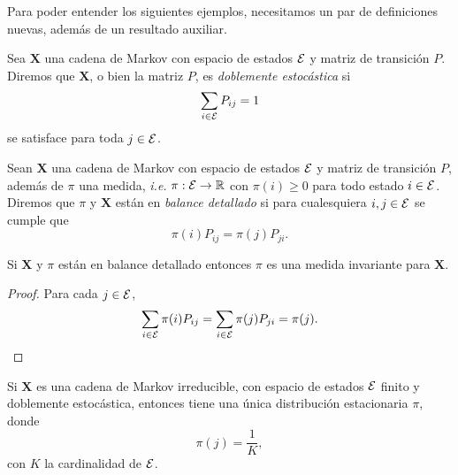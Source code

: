 Para poder entender los siguientes ejemplos, necesitamos un par de definiciones nuevas, además de un resultado auxiliar.

\begin{definition}
    Sea $\bm X$ una cadena de Markov con espacio de estados $\mathcal{E}$ y matriz de transición $P$. Diremos que $\bm X$, o bien la matriz $P$, es \emph{doblemente estocástica} si 
    \[
        \sum_{i \in \mathcal{E}} P_{ij} = 1    
    \]
    se satisface para toda $j \in \mathcal{E}$.
\end{definition}

\begin{definition}
    Sean $\bm X$ una cadena de Markov con espacio de estados $\mathcal{E}$ y matriz de transición $P$, además de $\pi$ una medida, \emph{i.e.} $\pi: \mathcal{E} \to \mathbb{R}$ con $\pi(i) \geq 0$ para todo estado $i \in \mathcal{E}$. Diremos que $\pi$ y $\bm X$ están en \emph{balance detallado} si para cualesquiera $i, j \in \mathcal{E}$ se cumple que 
    \[
        \pi(i) P_{ij} = \pi(j) P_{ji}.    
    \]
\end{definition}

\begin{proposition}
    Si $\bm X$ y $\pi$ están en balance detallado entonces $\pi$ es una medida invariante para $\bm X$.
\end{proposition}

\begin{proof}
    Para cada $j \in \mathcal{E}$,
    \[
        \sum_{i \in \mathcal{E}} \pi(i) P_{ij} = \sum_{i \in \mathcal{E}} \pi(j) P_{ji} = \pi(j). \qedhere
    \]
\end{proof}

\begin{example}
    Si $\bm X$ es una cadena de Markov irreducible, con espacio de estados $\mathcal{E}$ finito y doblemente estocástica, entonces tiene una única distribución estacionaria $\pi$, donde \[\pi(j) = \frac 1 K,\] con $K$ la cardinalidad de $\mathcal{E}$.
\end{example}

